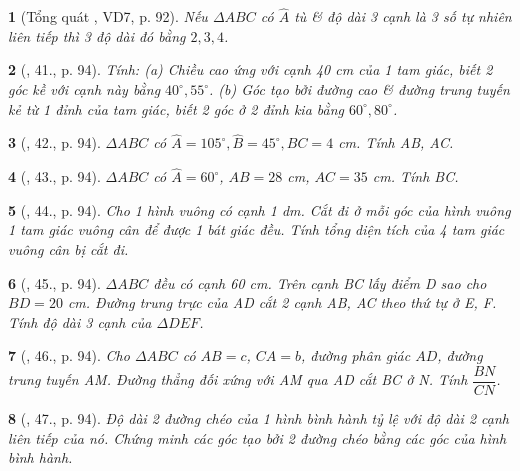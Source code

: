 \documentclass{article}
\newtheorem{baitoan}{}
\begin{document}
\begin{baitoan}[Tổng quát \cite{Binh_Toan_9_tap_1}, VD7, p. 92]
	Nếu $\Delta ABC$ có $\widehat{A}$ tù \& độ dài 3 cạnh là 3 số tự nhiên liên tiếp thì 3 độ dài đó bằng $2,3,4$.
\end{baitoan}

\begin{baitoan}[\cite{Binh_Toan_9_tap_1}, 41., p. 94]
	Tính: (a) Chiều cao ứng với cạnh {\rm40 cm} của 1 tam giác, biết 2 góc kề với cạnh này bằng $40^\circ,55^\circ$. (b) Góc tạo bởi đường cao \& đường trung tuyến kẻ từ 1 đỉnh của tam giác, biết 2 góc ở 2 đỉnh kia bằng $60^\circ,80^\circ$.
\end{baitoan}

\begin{baitoan}[\cite{Binh_Toan_9_tap_1}, 42., p. 94]
	$\Delta ABC$ có $\widehat{A} = 105^\circ,\widehat{B} = 45^\circ, BC = 4$ {\rm cm}. Tính AB, AC.
\end{baitoan}

\begin{baitoan}[\cite{Binh_Toan_9_tap_1}, 43., p. 94]
	$\Delta ABC$ có $\widehat{A} = 60^\circ$, $AB = 28$ {\rm cm}, $AC = 35$ {\rm cm}. Tính BC.
\end{baitoan}

\begin{baitoan}[\cite{Binh_Toan_9_tap_1}, 44., p. 94]
	Cho 1 hình vuông có cạnh {\rm1 dm}. Cắt đi ở mỗi góc của hình vuông 1 tam giác vuông cân để được 1 bát giác đều. Tính tổng diện tích của 4 tam giác vuông cân bị cắt đi.
\end{baitoan}

\begin{baitoan}[\cite{Binh_Toan_9_tap_1}, 45., p. 94]
	$\Delta ABC$ đều có cạnh {\rm60 cm}. Trên cạnh BC lấy điểm D sao cho $BD = 20$ {\rm cm}. Đường trung trực của AD cắt 2 cạnh AB, AC theo thứ tự ở E, F. Tính độ dài 3 cạnh của $\Delta DEF$.
\end{baitoan}

\begin{baitoan}[\cite{Binh_Toan_9_tap_1}, 46., p. 94]
	Cho $\Delta ABC$ có $AB = c$, $CA = b$, đường phân giác $AD$, đường trung tuyến AM. Đường thẳng đối xứng với AM qua AD cắt BC ở N. Tính $\dfrac{BN}{CN}$.
\end{baitoan}

\begin{baitoan}[\cite{Binh_Toan_9_tap_1}, 47., p. 94]
	Độ dài 2 đường chéo của 1 hình bình hành tỷ lệ với độ dài 2 cạnh liên tiếp của nó. Chứng minh các góc tạo bởi 2 đường chéo bằng các góc của hình bình hành.
\end{baitoan}
\end{document}

